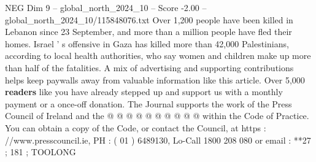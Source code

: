 \begin{textsample}{NEG Dim 9 – global\_north\_2024\_10 – Score -2.00 – global\_north\_2024\_10/115848076.txt}
Over 1,200 people have been killed in Lebanon since 23 September, and more than a million people have fled their homes.
Israel ' s offensive in Gaza has killed more than 42,000 Palestinians, according to local health authorities, who say women and children make up more than half of the fatalities.
A mix of advertising and supporting contributions helps keep paywalls away from valuable information like this article.
Over 5,000 \textbf{readers} like you have already stepped up and support us with a monthly payment or a once-off donation.
The Journal supports the work of the Press Council of Ireland and the @ @ @ @ @ @ @ @ @ @ within the Code of Practice.
You can obtain a copy of the Code, or contact the Council, at https : //www.presscouncil.ie, PH : ( 01 ) 6489130, Lo-Call 1800 208 080 or email : **27 ; 181 ; TOOLONG

\end{textsample}
